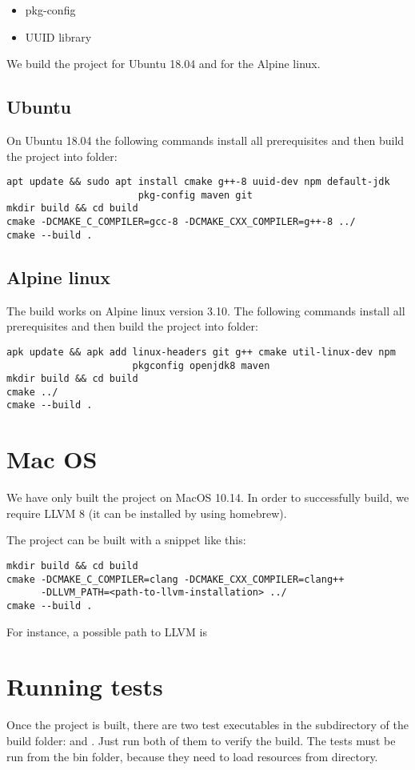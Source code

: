 \begin{itemize}
	\item pkg-config
	\item UUID library
\end{itemize}


We build the project for Ubuntu 18.04 and for the Alpine linux.
\subsection{Ubuntu}
On Ubuntu 18.04 the following commands install all prerequisites and then build the project into  folder:

\begin{verbatim}
apt update && sudo apt install cmake g++-8 uuid-dev npm default-jdk
                       pkg-config maven git
mkdir build && cd build
cmake -DCMAKE_C_COMPILER=gcc-8 -DCMAKE_CXX_COMPILER=g++-8 ../
cmake --build .
\end{verbatim}


\subsection{Alpine linux}

The build works on Alpine linux version 3.10. The following commands install all prerequisites and then build the project into  folder:
\begin{verbatim}
apk update && apk add linux-headers git g++ cmake util-linux-dev npm
                      pkgconfig openjdk8 maven
mkdir build && cd build
cmake ../
cmake --build .
\end{verbatim}


\section{Mac OS}
We have only built the project on MacOS 10.14. In order to successfully build, we require LLVM 8 (it can be installed by using homebrew).

The project can be built with a snippet like this:
\begin{verbatim}
mkdir build && cd build
cmake -DCMAKE_C_COMPILER=clang -DCMAKE_CXX_COMPILER=clang++
      -DLLVM_PATH=<path-to-llvm-installation> ../
cmake --build .
\end{verbatim}
For instance, a possible path to LLVM is 

\section{Running tests}
Once the project is built, there are two test executables in the  subdirectory of the build folder:  and . Just run both of them to verify the build. The tests must be run from the bin folder, because they need to load resources from  directory.

